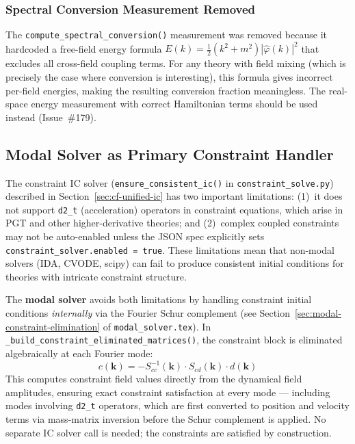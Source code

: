 \subsubsection{Spectral Conversion Measurement Removed}
\label{sec:cf-spectral-conversion}

The \texttt{compute\_spectral\_conversion()} measurement was removed because it
hardcoded a free-field energy formula $E(k) = \tfrac{1}{2}(k^2 + m^2)|\hat{\varphi}(k)|^2$
that excludes all cross-field coupling terms. For any theory with field mixing
(which is precisely the case where conversion is interesting), this formula
gives incorrect per-field energies, making the resulting conversion fraction
meaningless. The real-space energy measurement with correct Hamiltonian terms
should be used instead (Issue~\#179).

\subsection{Modal Solver as Primary Constraint Handler}
\label{sec:cf-modal-constraint}

The constraint IC solver (\texttt{ensure\_consistent\_ic()} in
\texttt{constraint\_solve.py}) described in Section~\ref{sec:cf-unified-ic} has
two important limitations: (1)~it does not support \texttt{d2\_t} (acceleration)
operators in constraint equations, which arise in PGT and other higher-derivative
theories; and (2)~complex coupled constraints may not be auto-enabled unless the
JSON spec explicitly sets \texttt{constraint\_solver.enabled = true}. These
limitations mean that non-modal solvers (IDA, CVODE, scipy) can fail to produce
consistent initial conditions for theories with intricate constraint structure.

The \textbf{modal solver} avoids both limitations by handling constraint initial
conditions \emph{internally} via the Fourier Schur complement (see
Section~\ref{sec:modal-constraint-elimination} of \texttt{modal\_solver.tex}).
In \texttt{\_build\_constraint\_eliminated\_matrices()}, the constraint block is
eliminated algebraically at each Fourier mode:
\begin{equation}
  c(\bm{k}) = -S_{cc}^{-1}(\bm{k}) \cdot S_{cd}(\bm{k}) \cdot d(\bm{k})
  \label{eq:cf-modal-schur}
\end{equation}
This computes constraint field values directly from the dynamical field
amplitudes, ensuring exact constraint satisfaction at every mode --- including
modes involving \texttt{d2\_t} operators, which are first converted to position
and velocity terms via mass-matrix inversion before the Schur complement is
applied. No separate IC solver call is needed; the constraints are satisfied by
construction.

